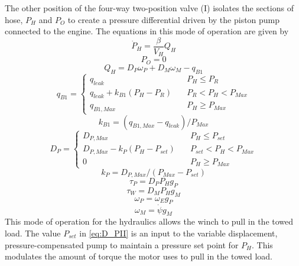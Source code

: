 The other position of the four-way two-position valve (I) isolates the sections of hose, $P_H$ and $P_O$ to create a pressure differential driven by the piston pump connected to the engine. The equations in this mode of operation are given by 
\begin{equation}\label{eq:VP1_eq1}
    \dot P_H = \frac{\beta}{V_H}Q_H
\end{equation}
\begin{equation}\label{eq:VP1_eq2}
    P_O = 0
\end{equation}
\begin{equation}\label{eq:VP1_eq3}
    Q_H = D_P\omega_P + D_M\omega_M - q_{B1}
\end{equation}
\begin{equation}\label{eq:VP1_eq4}
q_{B1} = \left\{
        \begin{array}{ll}
            q_{leak} & \quad P_H \leq P_R \\
            q_{leak} + k_{B1}(P_H - P_R) & \quad P_R < P_H < P_{Max} \\
            q_{B1,Max} & \quad P_H \geq P_{Max}
        \end{array}
    \right.
\end{equation}
\begin{equation}\label{eq:VP1_eq5}
    k_{B1} = (q_{B1,Max}-q_{leak})/P_{Max}
\end{equation}
\begin{equation}\label{eq:D_PII}
D_P = \left\{
        \begin{array}{ll}
            D_{P,Max} & \quad P_H \leq P_{set} \\
            D_{P,Max} - k_P(P_H - P_{set}) & \quad P_{set} < P_H < P_{Max} \\
            0 & \quad P_H \geq P_{Max}
        \end{array}
    \right.
\end{equation}
\begin{equation}\label{eq:VP1_eq7}
    k_P = D_{P,Max}/(P_{Max} - P_{set})
\end{equation}
\begin{equation}\label{eq:VP1_eq8}
    \tau_{P} = D_P P_H g_P
\end{equation}
\begin{equation}\label{eq:VP1_eq9}
    \tau_W = D_M P_H g_M
\end{equation}
\begin{equation}\label{eq:VP1_eq10}
    \omega_P = \omega_E g_P
\end{equation}
\begin{equation}\label{eq:VP1_eq11}
    \omega_M = \dot\psi g_M
\end{equation}
This mode of operation for the hydraulics allows the winch to pull in the towed load. The value $P_{set}$ in \ref{eq:D_PII} is an input to the variable displacement, pressure-compensated pump to maintain a pressure set point for $P_H$. This modulates the amount of torque the motor uses to pull in the towed load.